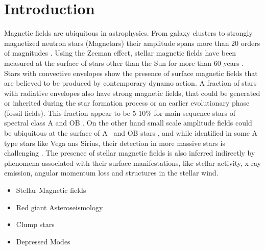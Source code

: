 \section{Introduction}
\label{intro}
Magnetic fields are ubiquitous in astrophysics. From  galaxy clusters to strongly magnetized neutron stars (Magnetars) their amplitude spans more than 20 orders of magnitudes \citep{Brandenburg_2005}. Using the Zeeman effect, stellar magnetic fields have been measured at the surface of stars other than the Sun for more than 60 years \citep{Babcock_1947}. 
Stars with convective envelopes show the presence of surface magnetic fields that are believed to be produced by contemporary dynamo action. A fraction of stars with radiative envelopes also have strong magnetic fields, that could be generated or inherited during the star formation process or an earlier evolutionary phase (fossil fields). This fraction appear to be 5-10\% for main sequence stars of spectral class A and OB \citep{2012ASPC..464..405W}. On the other hand small scale amplitude fields could be ubiquitous at the surface of A \ and OB stars \citep{Cantiello_2011}, and while identified in some A type stars like Vega ans Sirius, their detection in more massive stars is challenging \cite{2013A&A...554A..93K}.
The presence of  stellar magnetic fields is also inferred indirectly by phenomena associated with their surface manifestations, like stellar activity, x-ray emission, angular momentum loss and structures in the stellar wind. 



\begin{itemize}
\item Stellar Magnetic fields
\item Red giant Asteroseismology
\item Clump stars
\item Depressed Modes
\end{itemize}


  